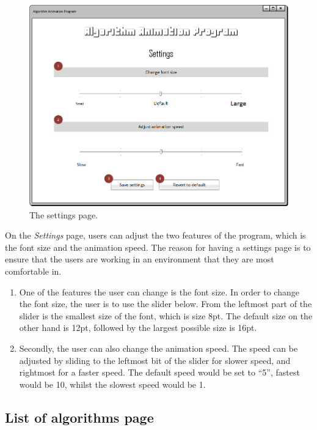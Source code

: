 \begin{figure}[H]
\centering
\hspace*{-0.5cm}
\includegraphics[scale=0.8]{images/report_images/uiSettings.png}
\caption{The settings page.}
\label{uiSettings}
\end{figure}

On the \textit{Settings} page, users can adjust the two features of the program, which is the font size and the animation speed. The reason for having a settings page is to ensure that the users are working in an environment that they are most comfortable in.

\begin{enumerate}
\item One of the features the user can change is the font size. In order to change the font size, the user is to use the slider below. From the leftmost part of the slider is the smallest size of the font, which is size 8pt. The default size on the other hand is 12pt, followed by the largest possible size is 16pt. 
\item Secondly, the user can also change the animation speed. The speed can be adjusted by sliding to the leftmost bit of the slider for slower speed, and rightmost for a faster speed. The default speed would be set to ``5'', fastest would be 10, whilst the slowest speed would be 1.
\end{enumerate}

\subsection{List of algorithms page}

